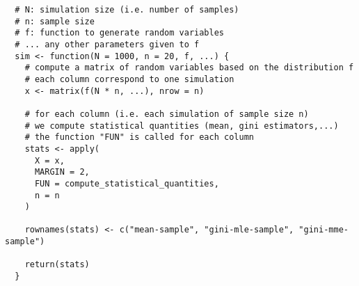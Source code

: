 \documentclass[10pt, a4paper, nofootinbib]{scrartcl}
\begin{document}
\begin{verbatim}
  # N: simulation size (i.e. number of samples)
  # n: sample size
  # f: function to generate random variables
  # ... any other parameters given to f
  sim <- function(N = 1000, n = 20, f, ...) {
    # compute a matrix of random variables based on the distribution f
    # each column correspond to one simulation
    x <- matrix(f(N * n, ...), nrow = n)

    # for each column (i.e. each simulation of sample size n)
    # we compute statistical quantities (mean, gini estimators,...)
    # the function "FUN" is called for each column
    stats <- apply(
      X = x,
      MARGIN = 2,
      FUN = compute_statistical_quantities,
      n = n
    )

    rownames(stats) <- c("mean-sample", "gini-mle-sample", "gini-mme-sample")

    return(stats)
  }
\end{verbatim}
\end{document}
